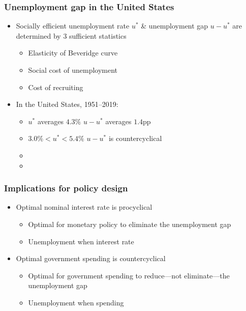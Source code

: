 \documentclass[11pt,aspectratio=169,xcolor={dvipsnames},hyperref={pdftex,pdfpagemode=UseNone,hidelinks,pdfdisplaydoctitle=true},usepdftitle=false]{beamer}
\begin{document}
\begin{frame}
\frametitle{Unemployment gap in the United States}
\begin{itemize}
\item Socially efficient unemployment rate $u^*$ \& unemployment gap $u-u^*$ are determined by 3 sufficient statistics
\begin{itemize}
\item Elasticity of Beveridge curve
\item Social cost of unemployment
\item Cost of recruiting
\end{itemize} 
\item In the United States, 1951--2019:
\begin{itemize}
\item $u^*$ averages $4.3\%$ \then $u-u^*$ averages $1.4$pp
\item $3.0\% < u^*  < 5.4\%$ \then $u-u^*$ is countercyclical
\item[\then] 
\item[\then] 
\end{itemize}
\end{itemize}
\end{frame}


\begin{frame}
\frametitle{Implications for policy design}
\begin{itemize}
\item Optimal nominal interest rate is procyclical
\begin{itemize}
\item Optimal for monetary policy to eliminate the unemployment gap
\item Unemployment \down when interest rate \down
\end{itemize}
\item Optimal government spending is countercyclical
\begin{itemize}
\item Optimal for government spending to reduce---not eliminate---the unemployment gap
\item Unemployment \down when spending \up
\end{itemize}
\end{itemize}	
\end{frame}
\end{document}
